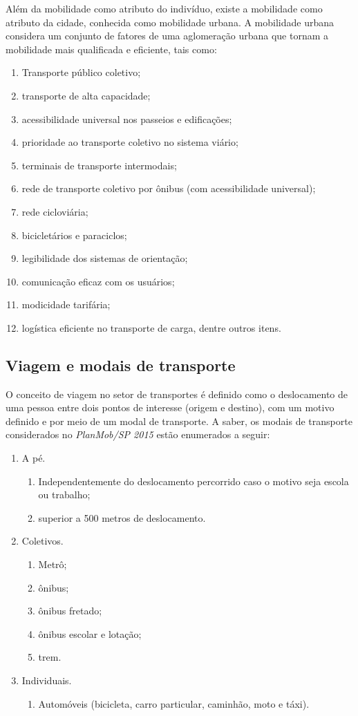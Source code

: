 \documentclass[
	12pt,				%
	oneside,			%
	a4paper,			%
	english,			%
	brazil				%
	]{abntex2ppgsi}
\begin{document}
{Além da mobilidade como atributo do indivíduo, existe a mobilidade como atributo da cidade, conhecida como mobilidade urbana. A mobilidade urbana considera um conjunto de fatores de uma aglomeração urbana que tornam a mobilidade mais qualificada e eficiente, tais como: \begin{enumerate}
\item Transporte público coletivo;
\item  transporte de alta capacidade;
\item  acessibilidade universal nos passeios e edificações;
\item prioridade ao transporte coletivo no sistema viário;
\item terminais de transporte intermodais;
\item rede de transporte coletivo por ônibus (com acessibilidade universal);
\item rede cicloviária;
\item bicicletários e paraciclos;
\item  legibilidade dos sistemas de orientação;
\item comunicação eficaz com os usuários;
\item modicidade tarifária;
\item  logística eficiente no transporte de carga, dentre outros itens.
\end{enumerate} 

\subsection{Viagem e modais de transporte}

O conceito de viagem no setor de transportes é definido como o deslocamento de uma pessoa entre dois pontos de interesse (origem e destino), com um motivo definido e por meio de um modal de transporte.  A saber, os modais de transporte considerados no \textit{PlanMob/SP 2015} estão enumerados a seguir:

\begin{enumerate}
\item A pé.
\begin{enumerate}
\item Independentemente do deslocamento percorrido caso o motivo seja escola ou trabalho;
\item  superior a 500 metros de deslocamento.
\end{enumerate}
\item Coletivos.
\begin{enumerate}
\item Metrô;
\item ônibus;
\item ônibus fretado;
\item ônibus escolar e lotação;
\item trem.
\end{enumerate}
\item Individuais.
\begin{enumerate}
\item Automóveis (bicicleta, carro particular, caminhão, moto e táxi).
\end{enumerate}
\end{enumerate}


}
\end{document}
